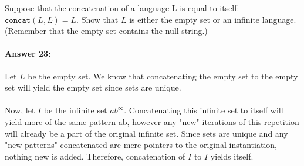 \documentclass[10pt]{article}
\begin{document}
Suppose that the concatenation of a language L is equal to itself:
$\texttt{concat}(L,L) = L$. Show that $L$ is either the empty set or
an infinite language. (Remember that the empty set contains the null
string.)

\paragraph{Answer 23:} 
Let $L$ be the empty set. We know that concatenating the empty set to the empty set will yield the empty set since sets are unique.
\\
\\ 
Now, let $I$ be the infinite set ${ab}^\infty$. Concatenating this infinite set to itself will yield more of the same pattern ab, however any "new" iterations of this repetition will already be a part of the original infinite set. Since sets are unique and any "new patterns" concatenated are mere pointers to the original instantiation, nothing new is added.  Therefore, concatenation of $I$ to $I$ yields itself. 
\end{document}
